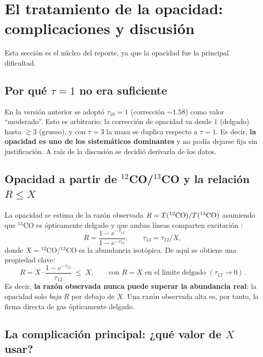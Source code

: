 \documentclass[12pt, a4paper]{article}
\begin{document}
\section{El tratamiento de la opacidad: complicaciones y discusión}

Esta sección es el núcleo del reporte, ya que la opacidad fue la principal dificultad.

\subsection{Por qué $\tau=1$ no era suficiente}

En la versión anterior se adoptó $\tau_{10}=1$ (corrección $\sim 1.58$) como valor
``moderado''. Esto es arbitrario: la corrección de opacidad va desde $1$ (delgado) hasta
$\gtrsim 3$ (grueso), y con $\tau=3$ la masa se duplica respecto a $\tau=1$. Es decir,
\textbf{la opacidad es uno de los sistemáticos dominantes} y no podía dejarse fija sin
justificación. A raíz de la discusión se decidió derivarla de los datos.

\subsection{Opacidad a partir de $^{12}$CO/$^{13}$CO y la relación $R \leq X$}

La opacidad se estima de la razón observada $R = T(^{12}{\rm CO})/T(^{13}{\rm CO})$
asumiendo que $^{13}$CO es ópticamente delgado y que ambas líneas comparten excitación
\citep{ramstedt2014}:
\begin{equation}
    R = \frac{1-e^{-\tau_{12}}}{1-e^{-\tau_{13}}},
    \qquad \tau_{13} = \tau_{12}/X,
    \label{eq:tau}
\end{equation}
donde $X = {}^{12}$CO/$^{13}$CO es la abundancia isotópica. De aquí se obtiene una propiedad
clave:
\begin{equation}
    R = X\cdot\frac{1-e^{-\tau_{12}}}{\tau_{12}} \;\leq\; X,
    \qquad\text{con } R = X \text{ en el límite delgado } (\tau_{12}\to0).
    \label{eq:RleqX}
\end{equation}
Es decir, \textbf{la razón observada nunca puede superar la abundancia real}: la opacidad
solo \emph{baja} $R$ por debajo de $X$. Una razón observada alta es, por tanto, la firma
directa de gas ópticamente delgado.

\subsection{La complicación principal: ¿qué valor de $X$ usar?}
\end{document}
